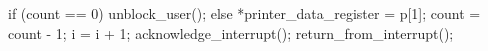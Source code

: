 \documentclass[varwidth=17em,crop]{standalone}
\begin{document}
\begin{ccode}
if (count == 0) {
  unblock_user();
} else {
  *printer_data_register = p[1];
  count = count - 1;
  i = i + 1;
}
acknowledge_interrupt();
return_from_interrupt();
\end{ccode}
\end{document}
